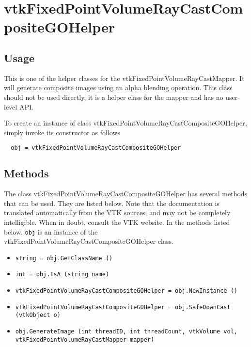 \section{vtkFixedPointVolumeRayCastCompositeGOHelper}

\subsection{Usage}

 This is one of the helper classes for the vtkFixedPointVolumeRayCastMapper. 
 It will generate composite images using an alpha blending operation.
 This class should not be used directly, it is a helper class for
 the mapper and has no user-level API.


To create an instance of class vtkFixedPointVolumeRayCastCompositeGOHelper, simply
invoke its constructor as follows
\begin{verbatim}
  obj = vtkFixedPointVolumeRayCastCompositeGOHelper
\end{verbatim}
\subsection{Methods}

The class vtkFixedPointVolumeRayCastCompositeGOHelper has several methods that can be used.
  They are listed below.
Note that the documentation is translated automatically from the VTK sources,
and may not be completely intelligible.  When in doubt, consult the VTK website.
In the methods listed below, \verb|obj| is an instance of the vtkFixedPointVolumeRayCastCompositeGOHelper class.
\begin{itemize}
\item  \verb|string = obj.GetClassName ()|

\item  \verb|int = obj.IsA (string name)|

\item  \verb|vtkFixedPointVolumeRayCastCompositeGOHelper = obj.NewInstance ()|

\item  \verb|vtkFixedPointVolumeRayCastCompositeGOHelper = obj.SafeDownCast (vtkObject o)|

\item  \verb|obj.GenerateImage (int threadID, int threadCount, vtkVolume vol, vtkFixedPointVolumeRayCastMapper mapper)|

\end{itemize}
